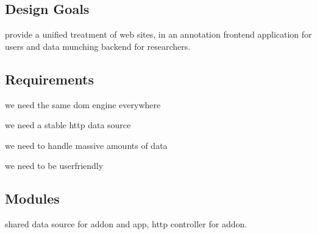 \subsection{Design Goals}

provide a unified treatment of web sites, in an annotation frontend application for users and data munching backend for researchers.

\subsection{Requirements}

we need the same dom engine everywhere

we need a stable http data source

we need to handle massive amounts of data

we need to be userfriendly

\subsection{Modules}

shared data source for addon and app, http controller for addon.
